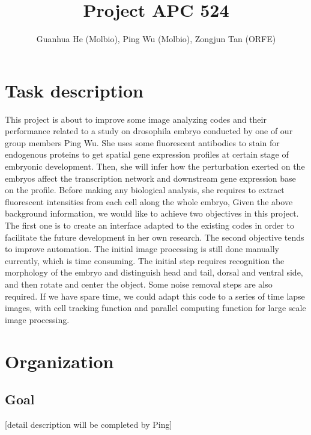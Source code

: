 \documentclass[a4paper,12pt]{article}
\title{Project APC 524}
\author{Guanhua He (Molbio), Ping Wu (Molbio), Zongjun Tan (ORFE)}
\numberwithin{equation}{section}
\begin{document}
 \maketitle
	
	
	\section{Task description}
	
This project is about to improve some image analyzing codes and their performance related to a study on drosophila embryo conducted by one of our group
members Ping Wu. She uses some fluorescent antibodies to stain for endogenous proteins to get spatial gene expression profiles at certain stage of embryonic development. Then, she will infer how the perturbation exerted on the embryos affect the transcription network and downstream gene expression base on the profile. Before making any biological analysis, she requires to extract fluorescent intensities from each cell along the whole embryo,
Given the above background information, we would like to achieve two objectives in this project. The first one is to create an interface adapted to the existing
codes in order to facilitate the future development in her own research. The second objective tends to improve automation. The initial image processing is still done manually currently, which is time consuming. The initial step requires recognition the morphology of the embryo and distinguish head and tail, dorsal and ventral side, and then rotate and center the object. Some noise removal steps are also required. If we have spare time, we could adapt this code to a series of time lapse images, with cell tracking function and parallel computing function for large scale image processing.


	
	\section{Organization}

	\subsection{Goal}[detail description will be completed by Ping]
	
\end{document}
